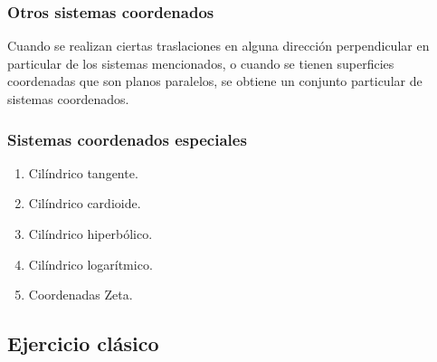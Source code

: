 \documentclass[12pt]{beamer}
\begin{document}
\begin{frame}
\frametitle{Otros sistemas coordenados}
Cuando se realizan ciertas traslaciones en alguna dirección perpendicular en particular de los sistemas mencionados, o cuando se tienen superficies coordenadas que son planos paralelos, \pause se obtiene un conjunto particular de sistemas coordenados.
\end{frame}
\begin{frame}
\frametitle{Sistemas coordenados especiales}
\begin{enumerate}[<+->]
\item Cilíndrico tangente.
\item Cilíndrico cardioide.
\item Cilíndrico hiperbólico.
\item Cilíndrico logarítmico.
\item Coordenadas Zeta.
\end{enumerate}
\end{frame}

\subsection{Ejercicio clásico}
\end{document}
